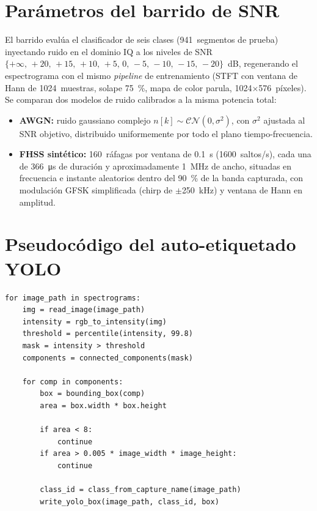 \section{Parámetros del barrido de SNR}
\label{anexo:snr_params}

El barrido evalúa el clasificador de seis clases (\num{941}~segmentos de prueba) inyectando ruido en el dominio IQ a los niveles de SNR $\{+\infty,\, +20,\, +15,\, +10,\, +5,\, 0,\, -5,\, -10,\, -15,\, -20\}$~dB, regenerando el espectrograma con el mismo \emph{pipeline} de entrenamiento (STFT con ventana de Hann de \num{1024}~muestras, solape \SI{75}{\percent}, mapa de color parula, \num{1024}$\times$\num{576}~píxeles). Se comparan dos modelos de ruido calibrados a la misma potencia total:

\begin{itemize}
  \item \textbf{AWGN:} ruido gaussiano complejo $n[k]\sim\mathcal{CN}(0,\sigma^2)$, con $\sigma^2$ ajustada al SNR objetivo, distribuido uniformemente por todo el plano tiempo-frecuencia.
  \item \textbf{FHSS sintético:} \num{160}~ráfagas por ventana de \SI{0.1}{\second} (\num{1600}~saltos/s), cada una de \SI{366}{\micro\second} de duración y aproximadamente \SI{1}{\mega\hertz} de ancho, situadas en frecuencia e instante aleatorios dentro del \SI{90}{\percent} de la banda capturada, con modulación GFSK simplificada (chirp de $\pm$\SI{250}{\kilo\hertz}) y ventana de Hann en amplitud.
\end{itemize}

\section{Pseudocódigo del auto-etiquetado YOLO}
\label{anexo:pseudocodigo_autolabel}

\begin{lstlisting}[style=python,caption={Pseudocódigo de generación automática de cajas YOLO.}]
for image_path in spectrograms:
    img = read_image(image_path)
    intensity = rgb_to_intensity(img)
    threshold = percentile(intensity, 99.8)
    mask = intensity > threshold
    components = connected_components(mask)

    for comp in components:
        box = bounding_box(comp)
        area = box.width * box.height

        if area < 8:
            continue
        if area > 0.005 * image_width * image_height:
            continue

        class_id = class_from_capture_name(image_path)
        write_yolo_box(image_path, class_id, box)
\end{lstlisting}

